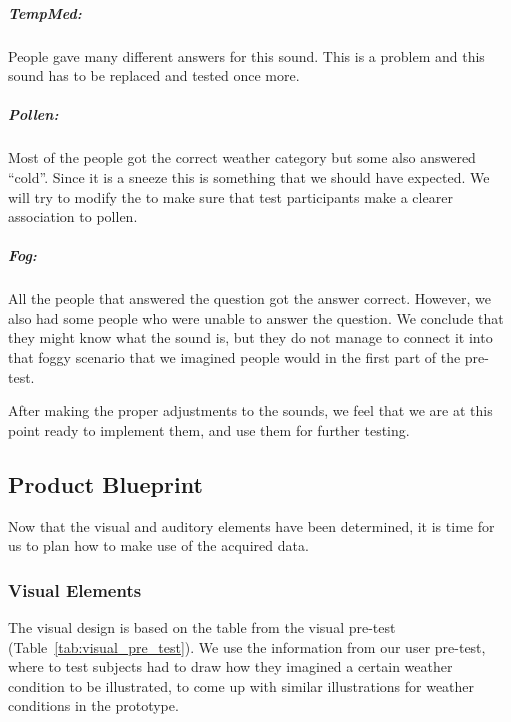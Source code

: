 \subparagraph{TempMed:} %
\label{subp:tempmed_}
People gave many different answers for this sound. 
This is a problem and this sound has to be replaced and tested once more.

\subparagraph{Pollen:} %
\label{subp:pollen_}
Most of the people got the correct weather category but some also answered \enquote{cold}. 
Since it is a sneeze this is something that we should have expected. 
We will try to modify the to make sure that test participants make a clearer association to pollen. 

\subparagraph{Fog:} %
\label{subp:fog_}
All the people that answered the question got the answer correct. 
However, we also had some people who were unable to answer the question. 
We conclude that they might know what the sound is, but they do not manage to connect it into that foggy scenario that we imagined people would in the first part of the pre-test.


After making the proper adjustments to the sounds, we feel that we are at this point ready to implement them, and use them for further testing.



\FloatBarrier
\subsection{Product Blueprint} %
\label{sub:product_blueprint}

Now that the visual and auditory elements have been determined, it is time for us to plan how to make use of the acquired data.

\subsubsection{Visual Elements} %
\label{ssub:visual_elements}

The visual design is based on the table from the visual pre-test (Table~\ref{tab:visual_pre_test}). We use the information from our user pre-test, where to test subjects had to draw how they imagined a certain weather condition to be illustrated, to come up with similar illustrations for weather conditions in the prototype.



